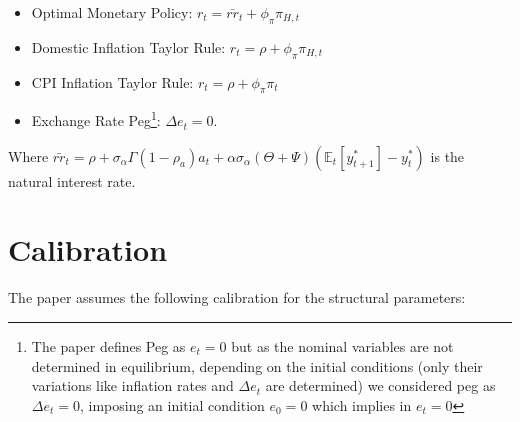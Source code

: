 \documentclass{article}
\newcommand{\Et}{\mathbb{E}_t}
\begin{document}
\begin{itemize}
    \item Optimal Monetary Policy: $r_t = \bar{rr}_t + \phi_\pi \pi_{H, t}$
    \item Domestic Inflation Taylor Rule: $r_t = \rho + \phi_\pi \pi_{H, t}$
    \item CPI Inflation Taylor Rule: $r_t = \rho + \phi_\pi \pi_{t}$
    \item Exchange Rate Peg\footnote{The paper defines Peg as $e_t = 0$ but as the nominal variables are not determined in equilibrium, depending on the initial conditions (only their variations like inflation rates and $\Delta e_t$ are determined) we considered peg as $\Delta e_t = 0$, imposing an initial condition $e_0 = 0$ which implies in $e_t = 0$}: $\Delta e_t = 0$.
\end{itemize}

Where $\bar{rr}_t = \rho + \sigma_\alpha \Gamma (1 - \rho_a) a_t + \alpha \sigma_\alpha (\Theta + \Psi)(\Et[y_{t+1}^*] - y_t^*)$ is the natural interest rate.


\section{Calibration}
The paper assumes the following calibration for the structural parameters:
\end{document}
